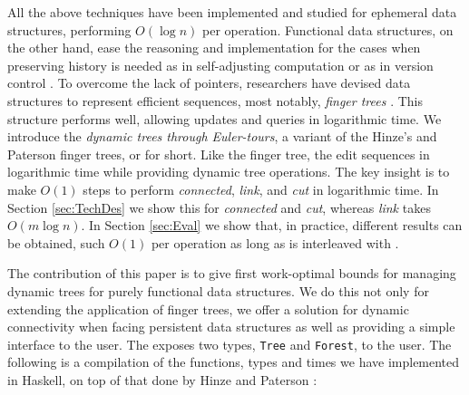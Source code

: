 All the above techniques have been implemented and studied for ephemeral data structures, performing $O(\log n)$ per operation. Functional data structures, on the other hand, ease the reasoning and implementation for the cases when preserving history is needed as in self-adjusting computation \cite{DynamizingAlgos} or as in version control \cite{CVS-Demaine}. To overcome the lack of pointers, researchers have devised data structures to represent efficient sequences, most notably, \textit{finger trees} \cite{FTs}. This structure performs well, allowing updates and queries in logarithmic time. We introduce the \emph{dynamic trees through Euler-tours}, a variant of the Hinze's and Paterson finger trees, or \dyntset for short. Like the finger tree, the \dyntset edit sequences in logarithmic time while providing dynamic tree operations. The key insight is to make $O(1)$ steps to perform \textit{connected}, \textit{link}, and \textit{cut} in logarithmic time. In Section \ref{sec:TechDes} we show this for \textit{connected} and \textit{cut}, whereas \textit{link} takes $O(m \log n)$. In Section \ref{sec:Eval} we show that, in practice, different results can be obtained, such $O(1)$ per operation as long as \link is interleaved with \cut.

The contribution of this paper is to give first work-optimal bounds for managing dynamic trees for purely functional data structures. We do this not only for extending the application of finger trees, we offer a solution for dynamic connectivity when facing persistent data structures as well as providing a simple interface to the user. The \dyntset exposes two types, \texttt{Tree} and \texttt{Forest}, to the user. The following is a compilation of  the functions, types and times we have implemented in Haskell, on top of that done by Hinze and Paterson \cite{FTs}:

